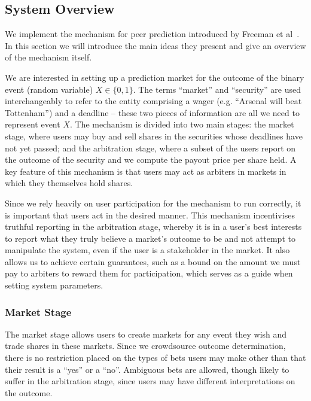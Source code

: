 \documentclass[10pt,a4paper]{article}
\theoremstyle{plain}
\theoremstyle{definition}
\begin{document}
\subsection{System Overview}

We implement the mechanism for peer prediction introduced by Freeman et
al~\cite{CODiPM}. In this section we will introduce the main ideas they present
and give an overview of the mechanism itself.

We are interested in setting up a prediction market for the outcome of the
binary event (random variable) $X \in \{0,1\}$. The terms ``market'' and
``security'' are used interchangeably to refer to the entity comprising a wager
(e.g. ``Arsenal will beat Tottenham'') and a deadline -- these two pieces of
information are all we need to represent event $X$. The mechanism is divided
into two main stages: the market stage, where users may buy and sell shares in
the securities whose deadlines have not yet passed; and the arbitration stage,
where a subset of the users report on the outcome of the security and we
compute the payout price per share held. A key feature of this mechanism is
that users may act as arbiters in markets in which they themselves hold shares.

Since we rely heavily on user participation for the mechanism to run correctly,
it is important that users act in the desired manner. This mechanism
incentivises truthful reporting in the arbitration stage, whereby it is in a
user's best interests to report what they truly believe a market's outcome to
be and not attempt to manipulate the system, even if the user is a stakeholder
in the market. It also allows us to achieve certain guarantees, such as a bound
on the amount we must pay to arbiters to reward them for participation, which
serves as a guide when setting system parameters.

\subsubsection{Market Stage}

The market stage allows users to create markets for any event they wish and
trade shares in these markets. Since we crowdsource outcome determination,
there is no restriction placed on the types of bets users may make other than
that their result is a ``yes'' or a ``no''. Ambiguous bets are allowed, though
likely to suffer in the arbitration stage, since users may have different
interpretations on the outcome.
\end{document}
